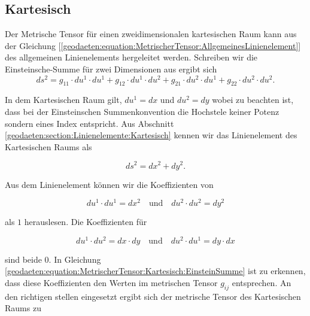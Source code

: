 %
%
%
%
\subsection{Kartesisch\label{geodaeten:section:MetrischerTensor:Kartesisch}}

Der Metrische Tensor für einen zweidimensionalen kartesischen Raum kann aus der Gleichung [\ref{geodaeten:equation:MetrischerTensor:AllgemeinesLinienelement}] des allgemeinen Linienelements hergeleitet werden.
Schreiben wir die Einsteinsche-Summe für zwei Dimensionen aus ergibt sich
\begin{equation}
	ds^2 = g_{11} \cdot du^1 \cdot du^1 + g_{12} \cdot du^1 \cdot du^2 + g_{21} \cdot du^2 \cdot du^1 + g_{22} \cdot du^2 \cdot du^2 .
	\label{geodaeten:equation:MetrischerTensor:Kartesisch:EinsteinSumme}
\end{equation}

In dem Kartesischen Raum gilt, $du^1 = dx$ und $du^2 = dy$ wobei zu beachten ist, dass bei der Einsteinschen Summenkonvention die Hochstele keiner Potenz sondern eines Index entspricht.
Aus Abschnitt \ref{geodaeten:section:Linienelemente:Kartesisch} kennen wir das Linienelement des Kartesischen Raums als

\begin{equation}
	ds^2 = dx^2 + dy^2 .
\end{equation}

Aus dem Linienelement können wir die Koeffizienten von 

\begin{equation}
du^1 \cdot du^1 = dx^2 \quad \text{und} \quad du^2 \cdot du^2 = dy^2 
\end{equation}

als $1$ herauslesen.
Die Koeffizienten für

\begin{equation}
du^1 \cdot du^2 = dx \cdot dy \quad \text{und} \quad du^2 \cdot du^1 = dy \cdot dx
\end{equation}

sind beide $0$.
In Gleichung \ref{geodaeten:equation:MetrischerTensor:Kartesisch:EinsteinSumme} ist zu erkennen, dass diese Koeffizienten den Werten im metrischen Tensor $g_{ij}$ entsprechen.
An den richtigen stellen eingesetzt ergibt sich der metrische Tensor des Kartesischen Raums zu

